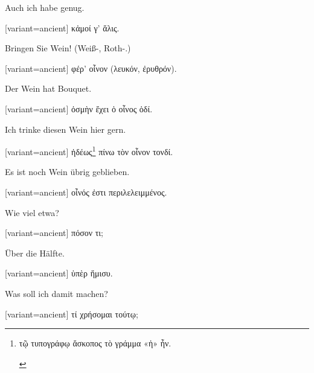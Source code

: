 Auch ich habe genug.

\switchcolumn

\begin{greek}[variant=ancient]%
κἀμοί γ' ἅλις.

\end{greek}%
\switchcolumn*

Bringen Sie Wein! (Weiß-, Roth-.)

\switchcolumn

\begin{greek}[variant=ancient]%
φέρ' οἶνον (λευκόν, ἐρυθρόν).

\end{greek}%
\switchcolumn*

Der Wein hat Bouquet.

\switchcolumn

\begin{greek}[variant=ancient]%
ὀσμὴν ἔχει ὁ οἶνος ὁδί.

\end{greek}%
\switchcolumn*

Ich trinke diesen Wein hier gern.

\switchcolumn

\begin{greek}[variant=ancient]%
ἡδέως\footnote{\begin{latin}%
\textgreek[variant=ancient]{τῷ τυπογράφῳ ἄσκοπος τὸ γράμμα «ἡ» ἦν.}\end{latin}%
} πίνω τὸν οἶνον τονδί.

\end{greek}%
\switchcolumn*

Es ist noch Wein übrig geblieben.

\switchcolumn

\begin{greek}[variant=ancient]%
οἶνός ἐστι περιλελειμμένος.

\end{greek}%
\switchcolumn*

Wie viel etwa?

\switchcolumn

\begin{greek}[variant=ancient]%
πόσον τι;

\end{greek}%
\switchcolumn*

Über die Hälfte.

\switchcolumn

\begin{greek}[variant=ancient]%
ὑπὲρ ἥμισυ.

\end{greek}%
\switchcolumn*

Was soll ich damit machen?

\switchcolumn

\begin{greek}[variant=ancient]%
τί χρήσομαι τούτῳ;

\end{greek}%
